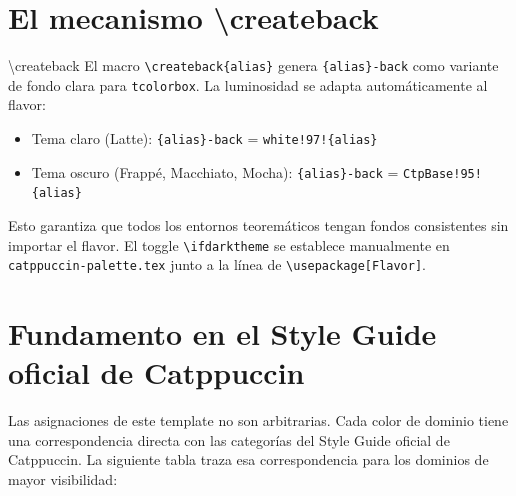 \section{El mecanismo \textbackslash createback}
\label{ap:sec:createback}

\begin{definicion}{\textbackslash createback}
\label{ap:def:createback}
El macro \texttt{\textbackslash createback\{alias\}} genera
\texttt{\{alias\}-back} como variante de fondo clara para
\texttt{tcolorbox}. La luminosidad se adapta automáticamente al flavor:
\begin{itemize}[leftmargin=2em]
  \item Tema claro (Latte):
    \texttt{\{alias\}-back} = \texttt{white!97!\{alias\}}
  \item Tema oscuro (Frappé, Macchiato, Mocha):
    \texttt{\{alias\}-back} = \texttt{CtpBase!95!\{alias\}}
\end{itemize}
\end{definicion}

Esto garantiza que todos los entornos teoremáticos tengan fondos
consistentes sin importar el flavor. El toggle \texttt{\textbackslash ifdarktheme}
se establece manualmente en \texttt{catppuccin-palette.tex} junto a la
línea de \texttt{\textbackslash usepackage[Flavor]}.

\section{Fundamento en el Style Guide oficial de Catppuccin}
\label{ap:sec:fundamento}

Las asignaciones de este template no son arbitrarias. Cada color de dominio
tiene una correspondencia directa con las categorías del Style Guide oficial
de Catppuccin. La siguiente tabla traza esa correspondencia para los dominios
de mayor visibilidad:

